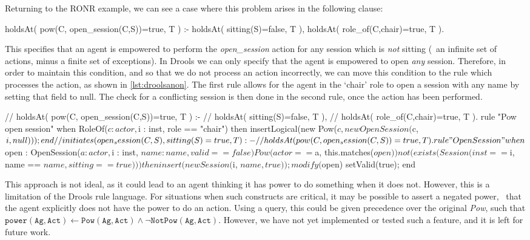 Returning to the \ac{RONR} example, we can see a case where this problem arises in the following clause:

\begin{prologinline}
holdsAt( pow(C, open_session(C,S))=true, T ) :-
	holdsAt( sitting(S)=false, T ),
	holdsAt( role_of(C,chair)=true, T ).
\end{prologinline}

This specifies that an agent is empowered to perform the \emph{open\_session}
action for any session which is \emph{not} sitting (\ie\ an infinite set of
actions, minus a finite set of exceptions). In Drools we can only specify that
the agent is empowered to open \emph{any} session. Therefore, in order to
maintain this condition, and so that we do not process an action incorrectly,
we can move this condition to the rule which processes the action, as shown in
\autoref{lst:droolsanon}. The first rule allows for the agent in the `chair'
role to open a session with any name by setting that field to null. The check
for a conflicting session is then done in the second rule, once the action has
been performed.

\begin{drools}[label=lst:droolsanon,caption=Drools manual translation of RONR open session.]
//	holdsAt( pow(C, open_session(C,S))=true, T ) :-
//		holdsAt( sitting(S)=false, T ),
//		holdsAt( role_of(C,chair)=true, T ).
rule "Pow open session"
	when
		RoleOf($c : actor, $i : inst, role == "chair")
	then
		insertLogical(new Pow($c, new OpenSession($c, $i, null)));
end

//	initiates( open_session(C,S), sitting(S)=true, T ) :-
//		holdsAt( pow(C, open_session(C,S))=true, T ).
rule "Open Session"
	when
		$open : OpenSession($a : actor, $i : inst, $name : name, valid == false)
		Pow(actor == $a, this.matches($open))
		not(exists(Session(inst == $i, name == $name, sitting == true)))
	then
		insert(new Session($i,  $name, true));
		modify($open) {
			setValid(true);
		}
end
\end{drools}

This approach is not ideal, as it could lead to an agent thinking it has power to do something when it does not. However, this is a limitation of the Drools rule language. For situations when such constructs are critical, it may be possible to assert a negated power, \ie\ that the agent explicitly does not have the power to do an action. Using a query, this could be given precedence over the original \emph{Pow}, such that $\mathtt{power(Ag,Act) \leftarrow \mathtt{Pow(Ag,Act)} \land \lnot \mathtt{NotPow(Ag,Act)}}$. However, we have not yet implemented or tested such a feature, and it is left for future work.

